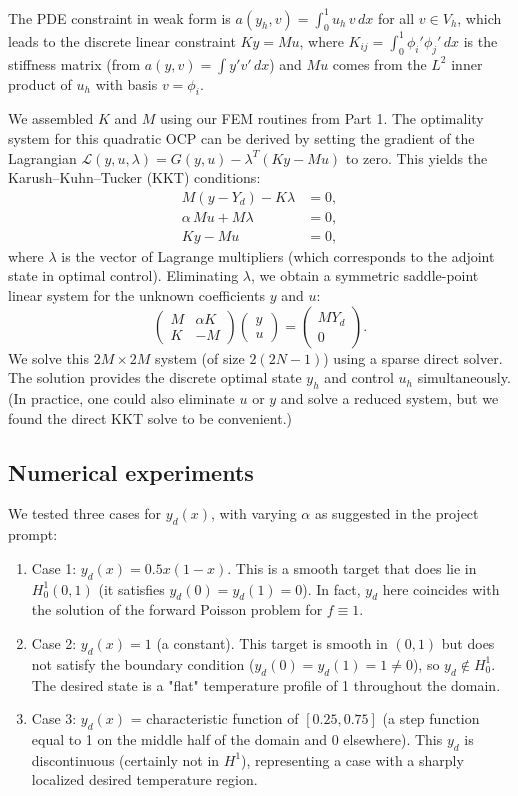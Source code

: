 \documentclass[a4paper,10pt]{article}
\begin{document}
The PDE constraint in weak form is $a(y_h,v) = \int_0^1 u_h\,v\,dx$ for all $v\in V_h$, which leads to the discrete linear constraint $Ky = Mu$, where $K_{ij}=\int_0^1 \phi_i'\phi_j'\,dx$ is the stiffness matrix (from $a(y,v)=\int y'v'\,dx$) and $Mu$ comes from the $L^2$ inner product of $u_h$ with basis $v=\phi_i$.

We assembled $K$ and $M$ using our FEM routines from Part 1. The optimality system for this quadratic OCP can be derived by setting the gradient of the Lagrangian $\mathcal{L}(y,u,\lambda) = G(y,u) - \lambda^T(Ky - Mu)$ to zero. This yields the Karush–Kuhn–Tucker (KKT) conditions:
\begin{align*}
	M(y-Y_d) - K\lambda &= 0,\\
	\alpha\,Mu + M\lambda &= 0,\\
	Ky-Mu &= 0,
\end{align*}
where $\lambda$ is the vector of Lagrange multipliers (which corresponds to the adjoint state in optimal control). Eliminating $\lambda$, we obtain a symmetric saddle-point linear system for the unknown coefficients $y$ and $u$:
\[
	\begin{pmatrix}
		M & \alpha K \\
		K & -M
	\end{pmatrix}
	\begin{pmatrix}
		y \\
		u
	\end{pmatrix}
	=
	\begin{pmatrix}
		MY_d \\
		0
	\end{pmatrix}.
\]
We solve this $2M \times 2M$ system (of size $2(2N-1)$) using a sparse direct solver. The solution provides the discrete optimal state $y_h$ and control $u_h$ simultaneously. (In practice, one could also eliminate $u$ or $y$ and solve a reduced system, but we found the direct KKT solve to be convenient.)

\subsection{Numerical experiments} We tested three cases for $y_d(x)$, with varying $\alpha$ as suggested in the project prompt:

\begin{enumerate}
	\item Case 1: $y_d(x) = 0.5x(1-x)$. This is a smooth target that does lie in $H^1_0(0,1)$ (it satisfies $y_d(0)=y_d(1)=0$). In fact, $y_d$ here coincides with the solution of the forward Poisson problem for $f\equiv 1$.
	\item Case 2: $y_d(x) = 1$ (a constant). This target is smooth in $(0,1)$ but does not satisfy the boundary condition ($y_d(0)=y_d(1)=1\neq0$), so $y_d\notin H^1_0$. The desired state is a "flat" temperature profile of 1 throughout the domain.
	\item Case 3: $y_d(x)$ = characteristic function of $[0.25,0.75]$ (a step function equal to 1 on the middle half of the domain and 0 elsewhere). This $y_d$ is discontinuous (certainly not in $H^1$), representing a case with a sharply localized desired temperature region.
\end{enumerate}
\end{document}
